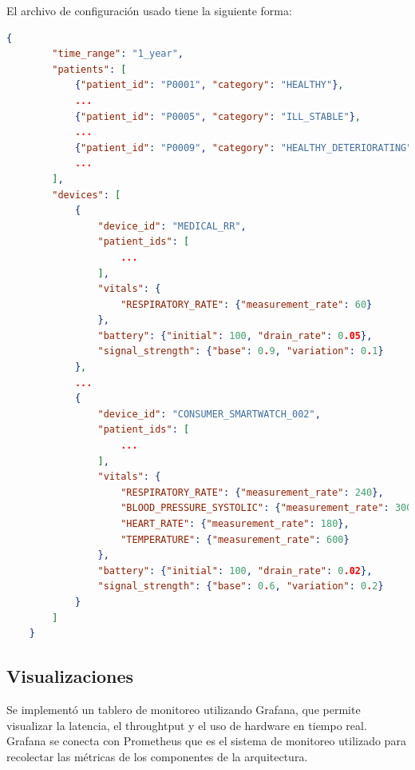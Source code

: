 \newpage

El archivo de configuración usado tiene la siguiente forma: 

\begin{lstlisting}[language=JSON]
    {
        "time_range": "1_year",
        "patients": [
            {"patient_id": "P0001", "category": "HEALTHY"},
            ...
            {"patient_id": "P0005", "category": "ILL_STABLE"},
            ...
            {"patient_id": "P0009", "category": "HEALTHY_DETERIORATING"},
            ...
        ],
        "devices": [
            {
                "device_id": "MEDICAL_RR",
                "patient_ids": [
                    ...
                ],
                "vitals": {
                    "RESPIRATORY_RATE": {"measurement_rate": 60}
                },
                "battery": {"initial": 100, "drain_rate": 0.05},
                "signal_strength": {"base": 0.9, "variation": 0.1}
            },
            ...
            {
                "device_id": "CONSUMER_SMARTWATCH_002",
                "patient_ids": [
                    ...
                ],
                "vitals": {
                    "RESPIRATORY_RATE": {"measurement_rate": 240},
                    "BLOOD_PRESSURE_SYSTOLIC": {"measurement_rate": 300},
                    "HEART_RATE": {"measurement_rate": 180},
                    "TEMPERATURE": {"measurement_rate": 600}
                },
                "battery": {"initial": 100, "drain_rate": 0.02},
                "signal_strength": {"base": 0.6, "variation": 0.2}
            }
        ]
    }
\end{lstlisting}

\newpage

\subsection{Visualizaciones}

Se implementó un tablero de monitoreo utilizando Grafana, que permite visualizar la latencia, el throughtput y el uso de hardware en tiempo real.
Grafana se conecta con Prometheus que es el sistema de monitoreo utilizado para recolectar las métricas de los componentes de la arquitectura.

